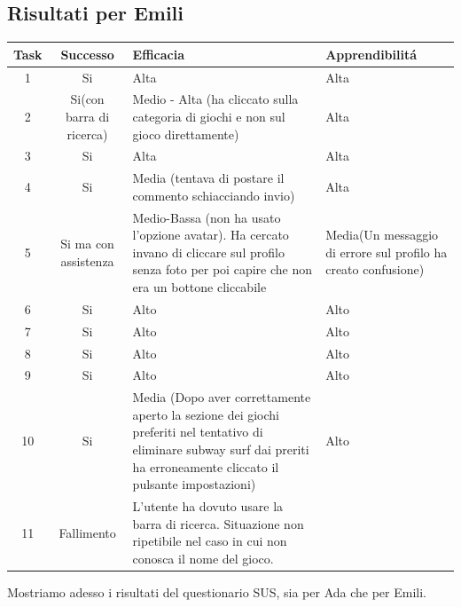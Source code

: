 \documentclass[../Report.tex]{subfiles}
\begin{document}
    \subsection{Risultati per Emili}
    \begin{table}[H]
        \begin{tabular}{|c|c|p{5cm}|p{4cm}|}
            \hline
            Task & Successo & Efficacia & Apprendibilitá \\
            \hline
            1 & Si & Alta & Alta \\
            \hline
            2 & Si(con barra di ricerca) & Medio - Alta (ha cliccato sulla categoria di giochi e non sul gioco direttamente) & Alta \\
            \hline
            3 & Si & Alta & Alta \\
            \hline
            4 & Si & Media (tentava di postare il commento schiacciando invio) & Alta \\
            \hline
            5 & Si ma con assistenza & Medio-Bassa
            (non ha usato l’opzione avatar). Ha cercato invano di cliccare sul profilo senza foto per poi capire che non era un bottone cliccabile & Media(Un messaggio di errore sul profilo ha creato confusione)   \\
            \hline
            6 & Si & Alto & Alto \\
            \hline
            7 & Si & Alto & Alto \\
            \hline
            8 & Si & Alto & Alto \\
            \hline
            9 & Si & Alto & Alto \\
            \hline
            10 & Si & Media (Dopo aver correttamente aperto la sezione dei giochi preferiti nel tentativo di eliminare subway surf dai preriti ha erroneamente cliccato il pulsante impostazioni) & Alto \\
            \hline 
            11 & Fallimento & L’utente ha dovuto usare la barra di ricerca. Situazione non ripetibile nel caso in cui non conosca il nome del gioco. & \\
            \hline
        \end{tabular}
    \end{table}
    Mostriamo adesso i risultati del questionario SUS, sia per Ada che per Emili. 
\end{document}
